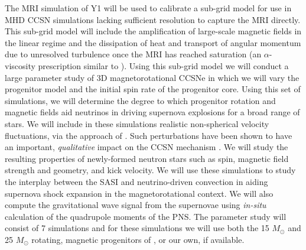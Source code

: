 The MRI simulation of Y1 will be used to calibrate a sub-grid model for use in MHD CCSN simulations lacking sufficient resolution to capture the MRI directly.
This sub-grid model will include the amplification of large-scale magnetic fields in the linear regime and the dissipation of heat and transport of angular momentum due to unresolved turbulence once the MRI has reached saturation (an $\alpha$-viscosity prescription similar to \citet{Thompson:2005iw}).
Using this sub-grid model we will conduct a large parameter study of 3D magnetorotational CCSNe in which we will vary the progenitor model and the initial spin rate of the progenitor core.
Using this set of simulations, we will determine the degree to which progenitor rotation and magnetic fields aid neutrinos in driving supernova explosions for a broad range of stars.
We will include in these simulations realistic non-spherical velocity fluctuations, via the approach of \citet{Chatzopoulos:2014uj}.
Such perturbations have been shown to have an important, {\it qualitative} impact on the CCSN mechanism \citep{Couch:2013bl}.
We will study the resulting properties of newly-formed neutron stars such as spin, magnetic field strength and geometry, and kick velocity.
We will use these simulations to study the interplay between the SASI and neutrino-driven convection in aiding supernova shock expansion in the magnetorotational context.
We will also compute the gravitational wave signal from the supernovae using {\it in-situ} calculation of the quadrupole moments of the PNS.
The parameter study will consist of 7 simulations and for these simulations we will use both the 15 $M_\odot$ and 25 $M_\odot$ rotating, magnetic progenitors of \citet{Heger:2005bi}, or our own, if available.


